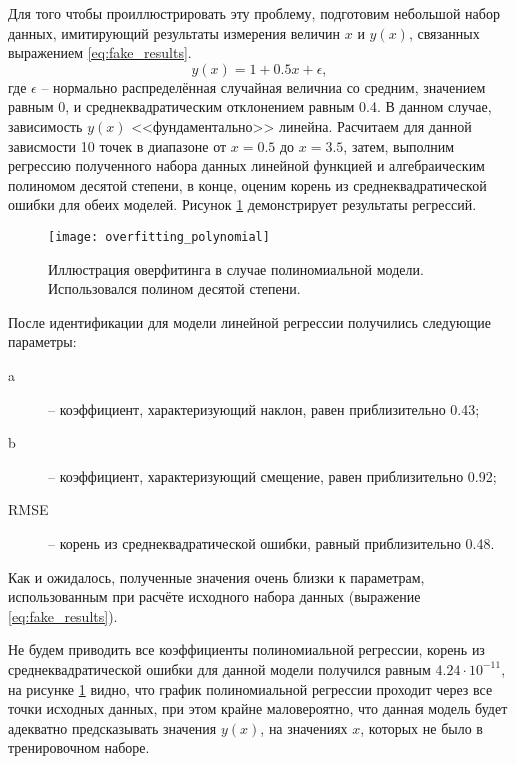 	Для того чтобы проиллюстрировать эту проблему, подготовим небольшой набор
	данных, имитирующий результаты измерения величин $x$ и $y(x)$, связанных 
	выражением \ref{eq:fake_results}.
	\begin{equation}
		\label{eq:fake_results}
		y(x) = 1 + 0.5x + \epsilon,
	\end{equation}
	где $\epsilon$ -- нормально распределённая случайная величниа со средним,
	значением равным 0, и среднеквадратическим отклонением равным 0.4.
	В данном случае, зависимость $y(x)$ <<фундаментально>> линейна. Расчитаем
	для данной зависмости 10 точек в диапазоне от $x=0.5$ до $x=3.5$, затем, 
	выполним регрессию полученного набора данных линейной функцией и 
	алгебраическим полиномом десятой степени, в конце, оценим корень из
	среднеквадратической ошибки для обеих моделей. Рисунок 
	\ref{pic:overfitting_polynomial} демонстрирует результаты регрессий.

    \begin{figure}[!htp]
        \centering
        \texttt{[image: overfitting\_polynomial]}
        \caption{Иллюстрация оверфитинга в случае полиномиальной модели.
                 Использовался полином десятой степени.}
        \label{pic:overfitting_polynomial}
    \end{figure}

    После идентификации для модели линейной регрессии получились следующие 
    параметры:
    \begin{description}
    	\item[a] -- коэффициент, характеризующий наклон, равен приблизительно 0.43;
    	\item[b] -- коэффициент, характеризующий смещение, равен приблизительно 0.92;
    	\item[RMSE] -- корень из среднеквадратической ошибки, равный приблизительно 0.48.
    \end{description}
    Как и ожидалось, полученные значения очень близки к параметрам, 
    использованным при расчёте исходного набора данных (выражение
    \ref{eq:fake_results}).

    Не будем приводить все коэффициенты полиномиальной регрессии, корень из
    среднеквадратической ошибки для данной модели получился равным 
    $4.24 \cdot 10^{-11}$, на рисунке \ref{pic:overfitting_polynomial} видно, что
    график полиномиальной регрессии проходит через все точки исходных данных,
    при этом крайне маловероятно, что данная модель будет адекватно предсказывать
    значения $y(x)$, на значениях $x$, которых не было в тренировочном наборе.

